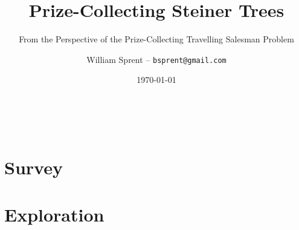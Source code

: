 \documentclass[12pt, a4paper]{report}
\title{Prize-Collecting Steiner Trees}
\author{William Sprent -- \texttt{bsprent@gmail.com}}
\subtitle{From the Perspective of the Prize-Collecting Travelling Salesman Problem}
\date{\today}
\begin{document}
\maketitle
~
\begin{abstract}
  
\end{abstract}

\tableofcontents
\clearpage




\part{Survey}




\glsresetall
\part{Exploration}



{}



{}
\printglossaries
\end{document}
